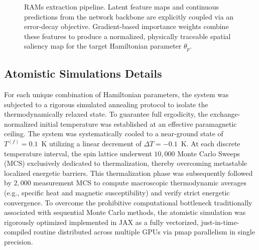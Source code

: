\documentclass[final,5p,times,twocolumn]{elsarticle}
\begin{document}
\begin{figure}[!ht]
  \centering
  \resizebox{\linewidth}{!}{
  
  }
  \caption{RAMs extraction pipeline. Latent feature maps and continuous predictions from the network backbone are explicitly coupled via an error-decay objective. Gradient-based importance weights combine these features to produce a normalized, physically traceable spatial saliency map for the target Hamiltonian parameter $\theta_{p}$.}
  \label{fig:rams_pipeline}
\end{figure}




\subsection{Atomistic Simulations Details}\label{sec:simulation_details}


For each unique combination of Hamiltonian parameters, 
the system was subjected to a rigorous simulated annealing 
protocol to isolate the thermodynamically relaxed state. 
To guarantee full ergodicity, the exchange-normalized 
initial temperature was established at an effective 
paramagnetic ceiling. The system was systematically 
cooled to a near-ground state of $T^{(f)} = 0.1$~K 
utilizing a linear decrement of $\Delta T = -0.1$~K. 
At each discrete temperature interval, the spin lattice 
underwent $10{,}000$ Monte Carlo Sweeps (MCS) exclusively
dedicated to thermalization, thereby overcoming metastable
localized energetic barriers. This thermalization phase
was subsequently followed by $2{,}000$ measurement MCS to
compute macroscopic thermodynamic averages (e.g., specific 
heat and magnetic susceptibility) and verify strict 
energetic convergence. To overcome the prohibitive 
computational bottleneck traditionally associated with 
sequential Monte Carlo methods, the atomistic simulation 
was rigorously optimized implemented in JAX as a fully vectorized, just-in-time-compiled routine distributed across multiple GPUs via pmap parallelism in single precision.
\end{document}
